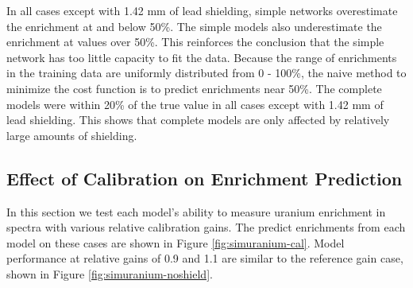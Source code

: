 In all cases except with 1.42 mm of lead shielding, simple networks overestimate the enrichment at and below 50\%. The simple models also underestimate the enrichment at values over 50\%. This reinforces the conclusion that the simple network has too little capacity to fit the data. Because the range of enrichments in the training data are uniformly distributed from 0 - 100\%, the naive method to minimize the cost function is to predict enrichments near 50\%. The complete models were 
within 20\% of the true value in all cases except with 1.42 mm of lead shielding. This shows that complete models are only affected by relatively large amounts of shielding.


\subsection{Effect of Calibration on Enrichment Prediction} \label{section_uranium_sim_cal}

In this section we test each model's ability to measure uranium enrichment in spectra with various relative calibration gains. The predict enrichments from each model on these cases are shown in Figure \ref{fig:simuranium-cal}. Model performance at relative gains of 0.9 and 1.1 are similar to the reference gain case, shown in Figure \ref{fig:simuranium-noshield}.

